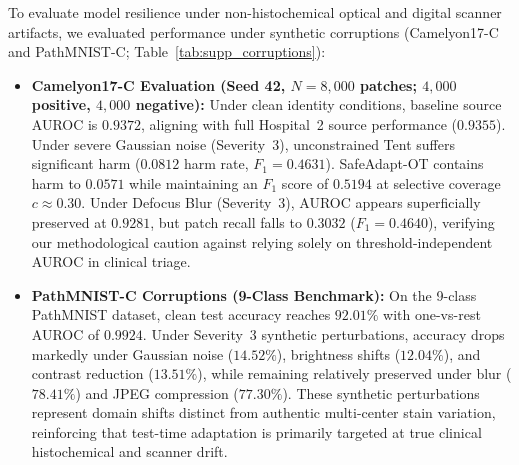 \documentclass[journal]{IEEEtran}
\begin{document}
To evaluate model resilience under non-histochemical optical and digital scanner artifacts, we evaluated performance under synthetic corruptions (Camelyon17-C and PathMNIST-C; Table~\ref{tab:supp_corruptions}):
\begin{itemize}
\item \textbf{Camelyon17-C Evaluation (Seed 42, $N=8{,}000$ patches; $4{,}000$ positive, $4{,}000$ negative):} Under clean identity conditions, baseline source AUROC is $0.9372$, aligning with full Hospital~2 source performance ($0.9355$). Under severe Gaussian noise (Severity~3), unconstrained Tent suffers significant harm ($0.0812$ harm rate, $F_1 = 0.4631$). SafeAdapt-OT contains harm to $0.0571$ while maintaining an $F_1$ score of $0.5194$ at selective coverage $c \approx 0.30$. Under Defocus Blur (Severity~3), AUROC appears superficially preserved at $0.9281$, but patch recall falls to $0.3032$ ($F_1 = 0.4640$), verifying our methodological caution against relying solely on threshold-independent AUROC in clinical triage.
\item \textbf{PathMNIST-C Corruptions (9-Class Benchmark):} On the 9-class PathMNIST dataset, clean test accuracy reaches $92.01\%$ with one-vs-rest AUROC of $0.9924$. Under Severity~3 synthetic perturbations, accuracy drops markedly under Gaussian noise ($14.52\%$), brightness shifts ($12.04\%$), and contrast reduction ($13.51\%$), while remaining relatively preserved under blur ($78.41\%$) and JPEG compression ($77.30\%$). These synthetic perturbations represent domain shifts distinct from authentic multi-center stain variation, reinforcing that test-time adaptation is primarily targeted at true clinical histochemical and scanner drift.
\end{itemize}
\end{document}
